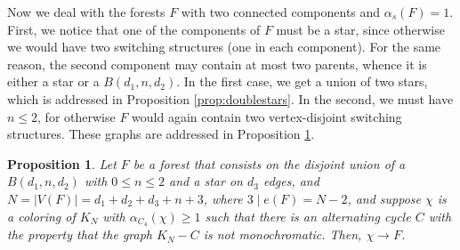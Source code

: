 \documentclass[11pt]{article}
\newtheorem{proposition}[theorem]{Proposition}
\begin{document}
Now we deal with the forests $F$ with two connected components and $\alpha_s(F)=1$. First, we notice that one of the components of $F$ must be a star, since otherwise we would have two switching structures (one in each component). For the same reason, the second component may contain at most two parents, whence it is either a star or a $B(d_1,n,d_2)$. In the first case, we get a union of two stars, which is addressed in Proposition \ref{prop:doublestars}. In the second, we must have $n \leq 2$, for otherwise $F$ would again contain two vertex-disjoint switching structures. These graphs are addressed in Proposition \ref{prop:broom+star}.


\begin{proposition}\label{prop:broom+star}
    Let $F$ be a forest that consists on the disjoint union of a $B(d_1,n,d_2)$ with $0 \leq n \leq 2$ and a star on $d_3$ edges, and $N=|V(F)|=d_1+d_2+d_3+n+3$, where $3 \mid e(F)=N-2$, and suppose $\chi$ is a coloring of $K_{N}$ with $\alpha_{C_4}(\chi) \geq 1$ such that there is an alternating cycle $C$ with the property that the graph $K_{N}-C$ is not monochromatic. Then, $\chi \rightarrow F$.
\end{proposition}
\end{document}
